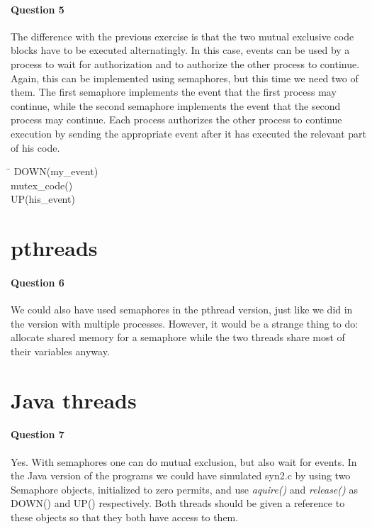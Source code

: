 \documentclass[a4paper,10pt]{article}
\begin{document}
\paragraph{Question 5}
The difference with the previous exercise is that the two mutual exclusive code blocks have to be executed alternatingly. In this case, events can be used by a process to wait for authorization and to authorize the other process to continue. Again, this can be implemented using semaphores, but this time we need two of them. The first semaphore implements the event that the first process may continue, while the second semaphore implements the event that the second process may continue. Each process authorizes the other process to continue execution by sending the appropriate event after it has executed the relevant part of his code.
\begin{tabbing}
\hspace{20pt}\=\kill
 \> DOWN(my\_event)\\ 
 \> mutex\_code()\\ 
 \> UP(his\_event) 
\end{tabbing}

\section{pthreads}
\paragraph{Question 6}
We could also have used semaphores in the pthread version, just like we did in the version with multiple processes. However, it would be a strange thing to do: allocate shared memory for a semaphore while the two threads share most of their variables anyway.

\section{Java threads}
\paragraph{Question 7}
Yes. With semaphores one can do mutual exclusion, but also wait for events. In the Java version of the programs we could have simulated syn2.c by using two Semaphore objects, initialized to zero permits, and use \emph{aquire()} and \emph{release()} as DOWN() and UP() respectively. Both threads should be given a reference to these objects so that they both have access to them.
\end{document}

